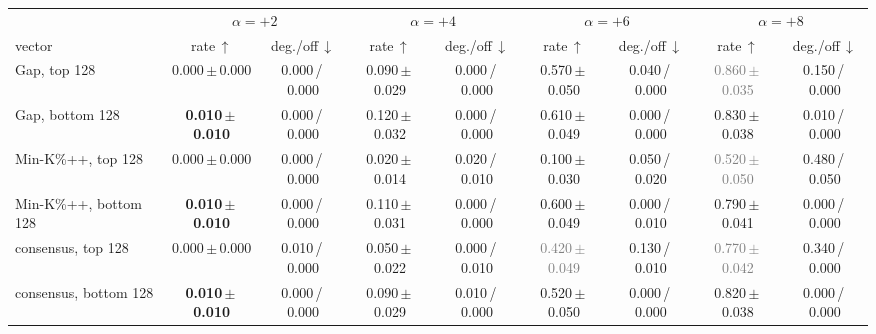 \begin{tabular}{@{}lcccccccc@{}}
\toprule
& \multicolumn{2}{c}{$\alpha=+2$} & \multicolumn{2}{c}{$\alpha=+4$} & \multicolumn{2}{c}{$\alpha=+6$} & \multicolumn{2}{c}{$\alpha=+8$} \\
\cmidrule(lr){2-3}\cmidrule(lr){4-5}\cmidrule(lr){6-7}\cmidrule(lr){8-9}
vector & rate\,$\uparrow$ & deg./off\,$\downarrow$ & rate\,$\uparrow$ & deg./off\,$\downarrow$ & rate\,$\uparrow$ & deg./off\,$\downarrow$ & rate\,$\uparrow$ & deg./off\,$\downarrow$ \\
\midrule
Gap, top 128 & 0.000\,{\scriptsize$\pm$\,0.000} & {\scriptsize 0.000\,/\,0.000} & 0.090\,{\scriptsize$\pm$\,0.029} & {\scriptsize 0.000\,/\,0.000} & 0.570\,{\scriptsize$\pm$\,0.050} & {\scriptsize 0.040\,/\,0.000} & \textcolor{gray}{0.860\,{\scriptsize$\pm$\,0.035}} & {\scriptsize 0.150\,/\,0.000} \\
Gap, bottom 128 & \textbf{0.010\,{\scriptsize$\pm$\,0.010}} & {\scriptsize 0.000\,/\,0.000} & 0.120\,{\scriptsize$\pm$\,0.032} & {\scriptsize 0.000\,/\,0.000} & 0.610\,{\scriptsize$\pm$\,0.049} & {\scriptsize 0.000\,/\,0.000} & 0.830\,{\scriptsize$\pm$\,0.038} & {\scriptsize 0.010\,/\,0.000} \\
Min-K\%++, top 128 & 0.000\,{\scriptsize$\pm$\,0.000} & {\scriptsize 0.000\,/\,0.000} & 0.020\,{\scriptsize$\pm$\,0.014} & {\scriptsize 0.020\,/\,0.010} & 0.100\,{\scriptsize$\pm$\,0.030} & {\scriptsize 0.050\,/\,0.020} & \textcolor{gray}{0.520\,{\scriptsize$\pm$\,0.050}} & {\scriptsize 0.480\,/\,0.050} \\
Min-K\%++, bottom 128 & \textbf{0.010\,{\scriptsize$\pm$\,0.010}} & {\scriptsize 0.000\,/\,0.000} & 0.110\,{\scriptsize$\pm$\,0.031} & {\scriptsize 0.000\,/\,0.000} & 0.600\,{\scriptsize$\pm$\,0.049} & {\scriptsize 0.000\,/\,0.010} & 0.790\,{\scriptsize$\pm$\,0.041} & {\scriptsize 0.000\,/\,0.000} \\
consensus, top 128 & 0.000\,{\scriptsize$\pm$\,0.000} & {\scriptsize 0.010\,/\,0.000} & 0.050\,{\scriptsize$\pm$\,0.022} & {\scriptsize 0.000\,/\,0.010} & \textcolor{gray}{0.420\,{\scriptsize$\pm$\,0.049}} & {\scriptsize 0.130\,/\,0.010} & \textcolor{gray}{0.770\,{\scriptsize$\pm$\,0.042}} & {\scriptsize 0.340\,/\,0.000} \\
consensus, bottom 128 & \textbf{0.010\,{\scriptsize$\pm$\,0.010}} & {\scriptsize 0.000\,/\,0.000} & 0.090\,{\scriptsize$\pm$\,0.029} & {\scriptsize 0.010\,/\,0.000} & 0.520\,{\scriptsize$\pm$\,0.050} & {\scriptsize 0.000\,/\,0.000} & 0.820\,{\scriptsize$\pm$\,0.038} & {\scriptsize 0.000\,/\,0.000} \\

\end{tabular}
